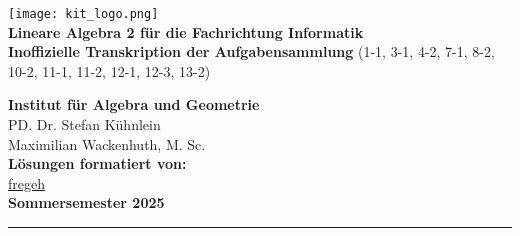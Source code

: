 \documentclass[11pt, a4paper]{article}
\begin{document}
\noindent
\begin{minipage}[t]{0.6\textwidth}
    \vspace{0pt}
    \texttt{[image: kit\_logo.png]} \\ %
    {\Large\bfseries Lineare Algebra 2 für die Fachrichtung Informatik} \\[0.5em]
    {\large\bfseries Inoffizielle Transkription der Aufgabensammlung}
    {(1-1, 3-1, 4-2, 7-1, 8-2, 10-2, 11-1, 11-2, 12-1, 12-3, 13-2)}
\end{minipage}%
\begin{minipage}[t]{0.4\textwidth}
    \vspace{0pt}
    \raggedleft
    \small
    \textbf{Institut für Algebra und Geometrie} \\
    PD. Dr. Stefan Kühnlein \\
    Maximilian Wackenhuth, M. Sc. \\
    \vspace{0.5em}
    \textbf{Lösungen formatiert von:} \\
    \href{https://github.com/fregeh}{fregeh} \\
    \vspace{1em}
    \textbf{Sommersemester 2025}
\end{minipage}

\vspace{0.5cm}
\hrule
\end{document}
